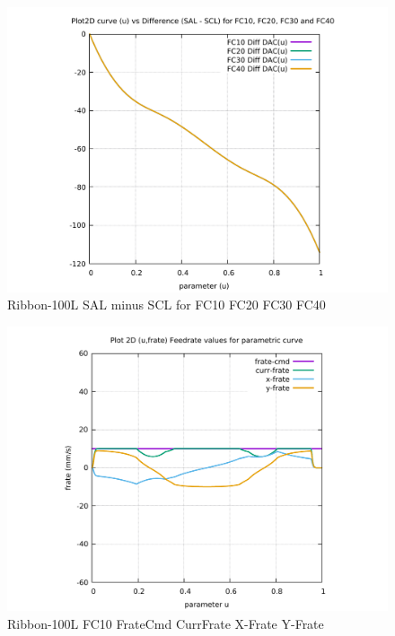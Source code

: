 \begin{figure}
	\caption     {Ribbon-100L SAL minus SCL for FC10 FC20 FC30 FC40}
	\label{26-img-Ribbon-100L SAL-minus-SCL-for-FC10-FC20-FC30-FC40.pdf}
\includegraphics[width=1.00\textwidth]{Chap4/appendix/app-Ribbon-100L/plots/26-img-Ribbon-100L-Difference-SAL-minus-SCL-for-FC10-FC20-FC30-FC40.pdf}
\end{figure}


\clearpage
\pagebreak

\begin{figure}
	\caption     {Ribbon-100L FC10 FrateCmd CurrFrate X-Frate Y-Frate}
	\label{27-img-Ribbon-100L-FC10-FrateCmd-CurrFrate-X-Frate-Y-Frate.pdf}
\includegraphics[width=1.00\textwidth]{Chap4/appendix/app-Ribbon-100L/plots/27-img-Ribbon-100L-FC10-FrateCmd-CurrFrate-X-Frate-Y-Frate.pdf}
\end{figure}


